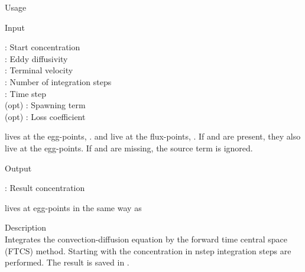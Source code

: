 {\begin{tdesc}
\item[Usage] 
\item[Input]
  \begin{vartab}
    \> : \> Start concentration \>  [eggs/m$^3$] \\
     \> : \> Eddy diffusivity    \>  [\sqmps]  \\
     \> : \> Terminal velocity   \>  [\mps]  \\
    \> : \> Number of integration steps \\
       \> : \> Time step           \>  [s] \\
       (opt) \> : \> Spawning term       \>  [eggs/m$^3$/s] \\
   (opt) \> : \> Loss coefficient \> [1/s] 
  \end{vartab}
   lives at the egg-points, .
   and  live at the flux-points, .
  If  and  are present, they also live at the egg-points.
  If  and  are missing, the source term is ignored. 
\item[Output]
  \begin{vartab}
   \>  : \> Result concentration \> [eggs/m$^3$]
  \end{vartab}
   lives at egg-points in the same way as 
\item[Description]\mbox{}\\
  Integrates the convection-diffusion equation by the 
  forward time central space (FTCS)  method. Starting 
  with the concentration in  nstep integration steps 
  are performed. The result is saved in .
\end{tdesc}





}
